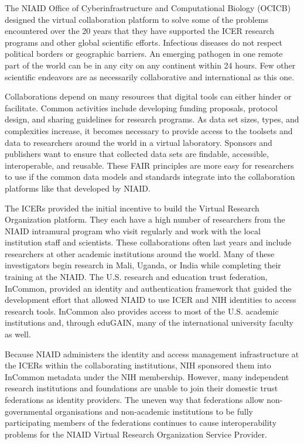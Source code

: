 \documentclass[fleqn,11pt]{wlscirep}
\begin{document}
{The NIAID Office of Cyberinfrastructure and Computational Biology (OCICB) designed the virtual collaboration platform to solve some of the problems encountered over the 20 years that they have supported the ICER research programs and other global scientific efforts.  Infectious diseases do not respect political borders or geographic barriers.  An emerging pathogen in one remote part of the world can be in any city on any continent within 24 hours.  Few other scientific endeavors are as necessarily collaborative and international as this one. 

Collaborations depend on many resources that digital tools can either hinder or facilitate.  Common activities include developing funding proposals, protocol design, and sharing guidelines for research programs.  As data set sizes, types, and complexities increase, it becomes necessary to provide access to the toolsets and data to researchers around the world in a virtual laboratory.  Sponsors and publishers want to ensure that collected data sets are findable, accessible, interoperable, and reusable.  These FAIR principles are more easy for researchers to use if the common data models and standards integrate into the collaboration platforms like that developed by NIAID.

The ICERs provided the initial incentive to build the Virtual Research Organization platform.  They each have a high number of researchers from the NIAID intramural program who visit regularly and work with the local institution staff and scientists.  These collaborations often last years and include researchers at other academic institutions around the world.  Many of these investigators begin research in Mali, Uganda, or India while completing their training at the NIAID.  The U.S. research and education trust federation, InCommon, provided an identity and authentication framework that guided the development effort that allowed NIAID to use ICER and NIH identities to access research tools. InCommon also provides access to most of the U.S. academic institutions and, through eduGAIN, many of the international university faculty as well. 

Because NIAID administers the identity and access management infrastructure at the ICERs within the collaborating institutions, NIH sponsored them into InCommon metadata under the NIH membership.  However, many independent research institutions and foundations are unable to join their domestic trust federations as identity providers.  The uneven way that federations allow non-governmental organisations and non-academic institutions to be fully participating members of the federations continues to cause interoperability problems for the NIAID Virtual Research Organization Service Provider.

}
\end{document}
